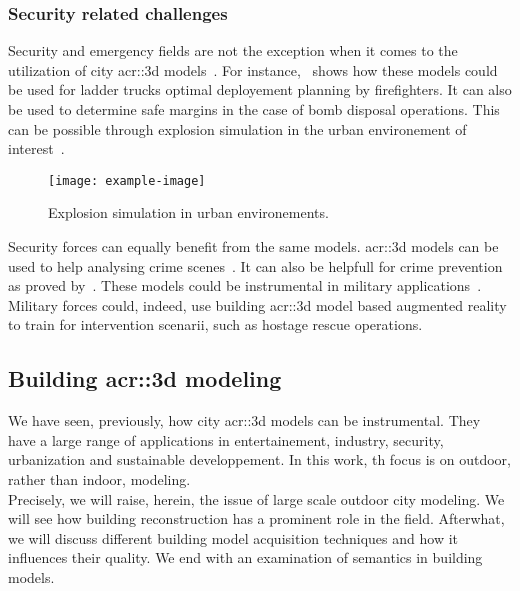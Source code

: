         \subsubsection{Security related challenges}
            Security and emergency fields are not the exception when it comes to the utilization of city \gls{acr::3d} models~\parencite{kwan2005emergency, ruppel2011designing}.
            For instance,~\textcite{chen2014application} shows how these models could be used for ladder trucks optimal deployement planning by firefighters.
            It can also be used to determine safe margins in the case of bomb disposal operations.
            This can be possible through explosion simulation in the urban environement of interest~\parencite{willenborg2015simulation}.\\
            \begin{figure}[htpb]
                \centering
                \texttt{[image: example-image]}            
                \caption{
                    \label{fig::explosion_simulation} Explosion simulation in urban environements.
                }
            \end{figure}
            Security forces can equally benefit from the same models.
            \gls{acr::3d} models can be used to help analysing crime scenes~\parencite{wolff2009towards}.
            It can also be helpfull for crime prevention as proved by~\textcite{wolff2008geospatial}.
            These models could be instrumental in military applications~\textcite{zlatanova2002trends, budroni2010automatic}.
            Military forces could, indeed, use building \gls{acr::3d} model based augmented reality to train for intervention scenarii, such as hostage rescue operations.

    \subsection{Building \gls*{acr::3d} modeling}
        \label{subsec::introduction::urban_3d_reconstruction::building_3d_modeling}
        We have seen, previously, how city \gls{acr::3d} models can be instrumental.
        They have a large range of applications in entertainement, industry, security, urbanization and sustainable developpement.
        In this work, th focus is on outdoor, rather than indoor, modeling.\\
        Precisely, we will raise, herein, the issue of large scale outdoor city modeling.
        We will see how building reconstruction has a prominent role in the field.
        Afterwhat, we will discuss different building model acquisition techniques and how it influences their quality.
        We end with an examination of semantics in building models.

